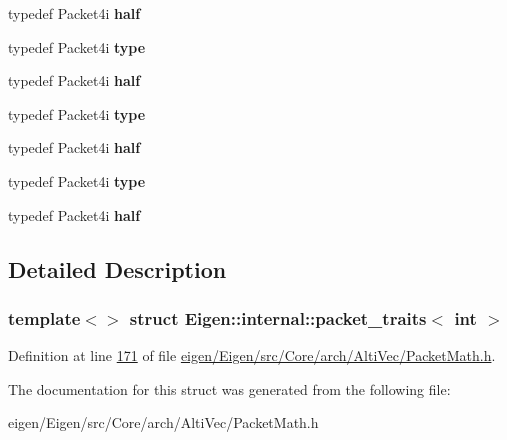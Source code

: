 \begin{DoxyCompactItemize}
typedef Packet4i {\bfseries half}
\item 
\mbox{\label{struct_eigen_1_1internal_1_1packet__traits_3_01int_01_4_a4c035d9ce275515f3eabf2934623190b}} 
typedef Packet4i {\bfseries type}
\item 
\mbox{\label{struct_eigen_1_1internal_1_1packet__traits_3_01int_01_4_abcd1d398b42e5452213afe6652f7cebb}} 
typedef Packet4i {\bfseries half}
\item 
\mbox{\label{struct_eigen_1_1internal_1_1packet__traits_3_01int_01_4_a4c035d9ce275515f3eabf2934623190b}} 
typedef Packet4i {\bfseries type}
\item 
\mbox{\label{struct_eigen_1_1internal_1_1packet__traits_3_01int_01_4_abcd1d398b42e5452213afe6652f7cebb}} 
typedef Packet4i {\bfseries half}
\item 
\mbox{\label{struct_eigen_1_1internal_1_1packet__traits_3_01int_01_4_a4c035d9ce275515f3eabf2934623190b}} 
typedef Packet4i {\bfseries type}
\item 
\mbox{\label{struct_eigen_1_1internal_1_1packet__traits_3_01int_01_4_abcd1d398b42e5452213afe6652f7cebb}} 
typedef Packet4i {\bfseries half}
\end{DoxyCompactItemize}


\subsection{Detailed Description}
\subsubsection*{template$<$$>$\newline
struct Eigen\+::internal\+::packet\+\_\+traits$<$ int $>$}



Definition at line \hyperlink{eigen_2_eigen_2src_2_core_2arch_2_alti_vec_2_packet_math_8h_source_l00171}{171} of file \hyperlink{eigen_2_eigen_2src_2_core_2arch_2_alti_vec_2_packet_math_8h_source}{eigen/\+Eigen/src/\+Core/arch/\+Alti\+Vec/\+Packet\+Math.\+h}.



The documentation for this struct was generated from the following file\+:\begin{DoxyCompactItemize}
\item 
eigen/\+Eigen/src/\+Core/arch/\+Alti\+Vec/\+Packet\+Math.\+h\end{DoxyCompactItemize}

